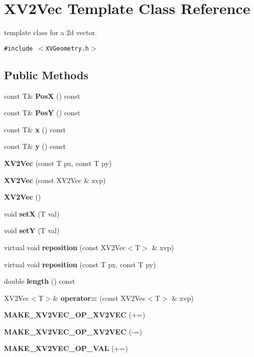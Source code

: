 \hypertarget{class_XV2Vec}{
\section{XV2Vec  Template Class Reference}
\label{XV2Vec}
}
template class for a 2d vector. 


{\tt \#include $<$XVGeometry.h$>$}

\subsection*{Public Methods}
\begin{CompactItemize}
\item 
const T\& {\bf Pos\-X} () const
\item 
const T\& {\bf Pos\-Y} () const
\item 
const T\& {\bf x} () const
\item 
const T\& {\bf y} () const
\item 
{\bf XV2Vec} (const T px, const T py)
\item 
{\bf XV2Vec} (const XV2Vec \& xvp)
\item 
{\bf XV2Vec} ()
\item 
void {\bf set\-X} (T val)
\item 
void {\bf set\-Y} (T val)
\item 
virtual void {\bf reposition} (const XV2Vec$<$T$>$ \& xvp)
\item 
virtual void {\bf reposition} (const T px, const T py)
\item 
double {\bf length} () const
\item 
XV2Vec$<$T$>$\& {\bf operator=} (const XV2Vec$<$T$>$ \& xvp)
\item 
\label{XV2Vec_a13}
\hypertarget{class_XV2Vec_a13}{
{\bf MAKE\_\-XV2VEC\_\-OP\_\-XV2VEC} (+=)}

\item 
\label{XV2Vec_a14}
\hypertarget{class_XV2Vec_a14}{
{\bf MAKE\_\-XV2VEC\_\-OP\_\-XV2VEC} (-=)}

\item 
\label{XV2Vec_a15}
\hypertarget{class_XV2Vec_a15}{
{\bf MAKE\_\-XV2VEC\_\-OP\_\-VAL} (+=)}


\end{CompactItemize}

